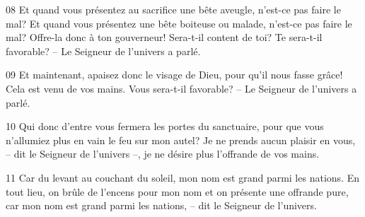 
08 Et quand vous présentez au sacrifice une bête aveugle, n’est-ce pas faire le mal? Et quand vous présentez une bête boiteuse ou malade, n’est-ce pas faire le mal? Offre-la donc à ton gouverneur! Sera-t-il content de toi? Te sera-t-il favorable? – Le Seigneur de l’univers a parlé.

09 Et maintenant, apaisez donc le visage de Dieu, pour qu’il nous fasse grâce! Cela est venu de vos mains. Vous sera-t-il favorable? – Le Seigneur de l’univers a parlé.

10 Qui donc d’entre vous fermera les portes du sanctuaire, pour que vous n’allumiez plus en vain le feu sur mon autel? Je ne prends aucun plaisir en vous, – dit le Seigneur de l’univers –, je ne désire plus l’offrande de vos mains.

11 Car du levant au couchant du soleil, mon nom est grand parmi les nations. En tout lieu, on brûle de l’encens pour mon nom et on présente une offrande pure, car mon nom est grand parmi les nations, – dit le Seigneur de l’univers.